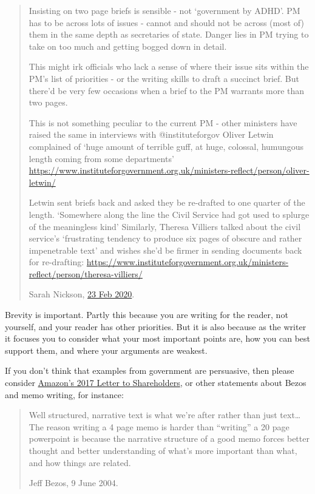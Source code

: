 \documentclass[
]{book}
\begin{document}
\begin{quote}
Insisting on two page briefs is sensible - not `government by ADHD'. PM has to be across lots of issues - cannot and should not be across (most of) them in the same depth as secretaries of state. Danger lies in PM trying to take on too much and getting bogged down in detail.

This might irk officials who lack a sense of where their issue sits within the PM's list of priorities - or the writing skills to draft a succinct brief. But there'd be very few occasions when a brief to the PM warrants more than two pages.

This is not something peculiar to the current PM - other ministers have raised the same in interviews with @instituteforgov Oliver Letwin complained of `huge amount of terrible guff, at huge, colossal, humungous length coming from some departments'
\url{https://www.instituteforgovernment.org.uk/ministers-reflect/person/oliver-letwin/}

Letwin sent briefs back and asked they be re-drafted to one quarter of the length. `Somewhere along the line the Civil Service had got used to splurge of the meaningless kind' Similarly, Theresa Villiers talked about the civil service's `frustrating tendency to produce six pages of obscure and rather impenetrable text' and wishes she'd be firmer in sending documents back for re-drafting:
\url{https://www.instituteforgovernment.org.uk/ministers-reflect/person/theresa-villiers/}

Sarah Nickson, \href{https://twitter.com/sarahjnickson/status/1231518746398908421}{23 Feb 2020}.
\end{quote}

Brevity is important. Partly this because you are writing for the reader, not yourself, and your reader has other priorities. But it is also because as the writer it focuses you to consider what your most important points are, how you can best support them, and where your arguments are weakest.

If you don't think that examples from government are persuasive, then please consider \href{https://www.sec.gov/Archives/edgar/data/1018724/000119312518121161/d456916dex991.htm}{Amazon's 2017 Letter to Shareholders}, or other statements about Bezos and memo writing, for instance:

\begin{quote}
Well structured, narrative text is what we're after rather than just text\ldots{} The reason writing a 4 page memo is harder than ``writing'' a 20 page powerpoint is because the narrative structure of a good memo forces better thought and better understanding of what's more important than what, and how things are related.

Jeff Bezos, 9 June 2004.
\end{quote}
\end{document}
